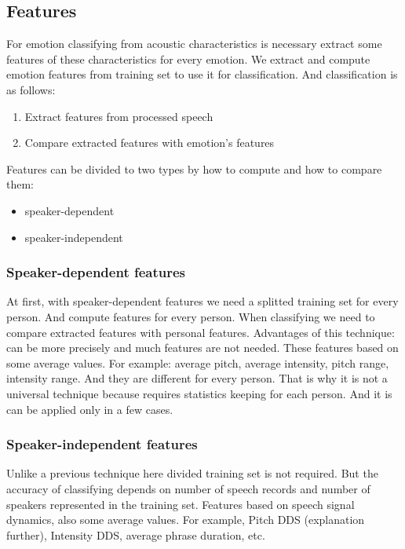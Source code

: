 \documentclass[12pt, letterpaper]{article}
\begin{document}
\subsection{Features}
For emotion classifying from acoustic characteristics is necessary extract some features of these characteristics for every emotion. We extract and compute emotion features from training set to use it for classification. And classification is as follows:
\begin{enumerate}
	\item Extract features from processed speech
	\item Compare extracted features with emotion's features
\end{enumerate}

Features can be divided to two types by how to compute and how to compare them:
\begin{itemize}
	\item speaker-dependent
	\item speaker-independent
\end{itemize}

\subsubsection{Speaker-dependent features}
At first, with speaker-dependent features we need a splitted training set for every person. And compute features for every person. When classifying we need to compare extracted features with personal features. Advantages of this technique: can be more precisely and much features are not needed. These features based on some average values. For example: average pitch, average intensity, pitch range, intensity range. And they are different for every person. That is why it is not a universal technique because requires statistics keeping for each person. And it is can be applied only in a few cases.
\subsubsection{Speaker-independent features}
Unlike a previous technique here divided training set is not required. But the accuracy of classifying depends on number of speech records and number of speakers represented in the training set. Features based on speech signal dynamics, also some average values. For example, Pitch DDS (explanation further), Intensity DDS, average phrase duration, etc.
\end{document}
